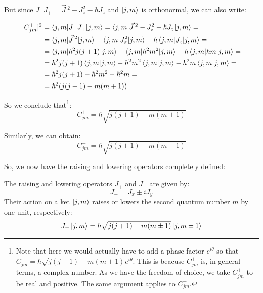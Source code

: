 But since $J_-J_+ = \vec{J}\,^2 - J_z^2 - \hbar J_z$ and $\ket{j,m}$ is orthonormal, we can also write:

\begin{equation}
    \begin{split}
        |C_{jm}^+|^2 &= \braket{j,m|J_-J_+|j,m} = \braket{j,m|\vec{J}\,^2 - J_z^2 - \hbar J_z|j,m} = \\
        &= \braket{j,m|\vec{J}\,^2|j,m} - \braket{j,m|J_z^2|j,m} - \hbar\braket{j,m|J_z|j,m} = \\
        &= \braket{j,m|\hbar^2j(j+1)|j,m} - \braket{j,m|\hbar^2m^2|j,m} - \hbar\braket{j,m|\hbar m|j,m} = \\
        &= \hbar^2j(j+1)\braket{j,m|j,m} - \hbar^2m^2\braket{j,m|j,m} - \hbar^2m\braket{j,m|j,m} = \\
        &= \hbar^2j(j+1) - \hbar^2m^2 - \hbar^2m = \\
        &= \hbar^2(j(j+1)-m(m+1))
    \end{split}
\end{equation}

So we conclude that\footnote{Note that here we would actually have to add a phase factor $e^{i\theta}$ so that $C_{jm}^+ = \hbar \sqrt{j(j+1)-m(m+1)}e^{i\theta}$. This is beacuse $C_{jm}^+$ is, in general terms, a complex number. As we have the freedom of choice, we take $C_{jm}^+$ to be real and positive. The same argument applies to $C_{jm}^-$.}:
\begin{equation}
    C_{jm}^+ = \hbar \sqrt{j(j+1)-m(m+1)}
\end{equation}

Similarly, we can obtain:
\begin{equation}
    C_{jm}^- = \hbar \sqrt{j(j+1)-m(m-1)}
\end{equation}

So, we now have the raising and lowering operators completely defined:
\begin{definition}
    The raising and lowering operators $J_+$ and $J_-$ are given by:
    \begin{equation}
        J_\pm = J_x \pm iJ_y
    \end{equation}
    Their action on a ket $\ket{j,m}$ raises or lowers the second quantum number $m$ by one unit, respectively:
    \begin{equation} \label{eq:raising_and_lowering_operators_J}
        J_\pm\ket{j,m} = \hbar \sqrt{j(j+1)-m(m\pm1)}\ket{j,m\pm 1}
    \end{equation}
\end{definition}

